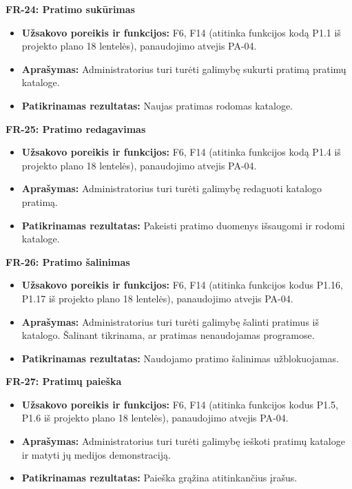 \vspace{0.3cm}
\noindent\textbf{FR-24: Pratimo sukūrimas}
\begin{itemize}
    \item \textbf{Užsakovo poreikis ir funkcijos:} F6, F14 (atitinka funkcijos kodą P1.1 iš projekto plano 18 lentelės), panaudojimo atvejis PA-04.
    \item \textbf{Aprašymas:} Administratorius turi turėti galimybę sukurti pratimą pratimų kataloge.
    \item \textbf{Patikrinamas rezultatas:} Naujas pratimas rodomas kataloge.
\end{itemize}

\vspace{0.3cm}
\noindent\textbf{FR-25: Pratimo redagavimas}
\begin{itemize}
    \item \textbf{Užsakovo poreikis ir funkcijos:} F6, F14 (atitinka funkcijos kodą P1.4 iš projekto plano 18 lentelės), panaudojimo atvejis PA-04.
    \item \textbf{Aprašymas:} Administratorius turi turėti galimybę redaguoti katalogo pratimą.
    \item \textbf{Patikrinamas rezultatas:} Pakeisti pratimo duomenys išsaugomi ir rodomi kataloge.
\end{itemize}

\vspace{0.3cm}
\noindent\textbf{FR-26: Pratimo šalinimas}
\begin{itemize}
    \item \textbf{Užsakovo poreikis ir funkcijos:} F6, F14 (atitinka funkcijos kodus P1.16, P1.17 iš projekto plano 18 lentelės), panaudojimo atvejis PA-04.
    \item \textbf{Aprašymas:} Administratorius turi turėti galimybę šalinti pratimus iš katalogo. Šalinant tikrinama, ar pratimas nenaudojamas programose.
    \item \textbf{Patikrinamas rezultatas:} Naudojamo pratimo šalinimas užblokuojamas.
\end{itemize}

\vspace{0.3cm}
\noindent\textbf{FR-27: Pratimų paieška}
\begin{itemize}
    \item \textbf{Užsakovo poreikis ir funkcijos:} F6, F14 (atitinka funkcijos kodus P1.5, P1.6 iš projekto plano 18 lentelės), panaudojimo atvejis PA-04.
    \item \textbf{Aprašymas:} Administratorius turi turėti galimybę ieškoti pratimų kataloge ir matyti jų medijos demonstraciją.
    \item \textbf{Patikrinamas rezultatas:} Paieška grąžina atitinkančius įrašus.
\end{itemize}

